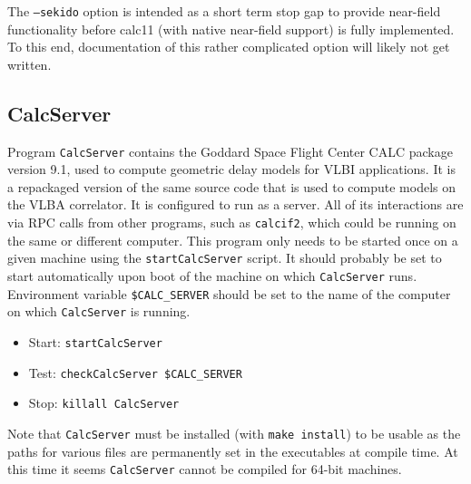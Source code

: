 The {\tt --sekido} option is intended as a short term stop gap to provide near-field functionality before calc11 (with native near-field support) is fully implemented.
To this end, documentation of this rather complicated option will likely not get written.








\subsection{CalcServer} \label{sec:CalcServer}

Program {\tt CalcServer} contains the Goddard Space Flight Center CALC package version 9.1, used to compute geometric delay models for VLBI applications.
It is a repackaged version of the same source code that is used to compute models on the VLBA correlator.
It is configured to run as a server.
All of its interactions are via RPC calls from other programs, such as {\tt calcif2}, which could be running on the same or different computer.
\newcommand{\oa}[1]{\hspace{-12pt}\makebox[12pt]{$\star$}#1}
This program only needs to be started once on a given machine using the {\tt startCalcServer} script.
It should probably be set to start automatically upon boot of the machine on which {\tt CalcServer} runs.
Environment variable {\tt \$CALC\_SERVER} should be set to the name of the computer on which {\tt CalcServer} is running.

\begin{itemize}
\item[] Start: {\tt startCalcServer}
\item[] Test: {\tt checkCalcServer \$CALC\_SERVER}
\item[] Stop: {\tt killall CalcServer}
\end{itemize}

\noindent
Note that {\tt CalcServer} must be installed (with {\tt make install}) to be usable as the paths for various files are permanently set in the executables at compile time.
At this time it seems {\tt CalcServer} cannot be compiled for 64-bit machines.








